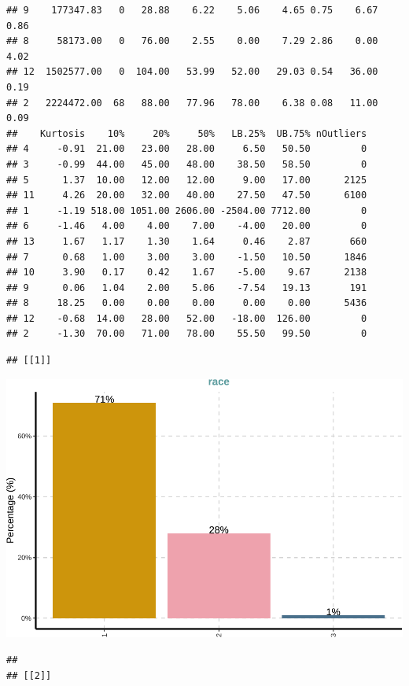\documentclass[
]{article}
\begin{document}
\begin{verbatim}
## 9    177347.83   0   28.88    6.22    5.06    4.65 0.75    6.67     0.86
## 8     58173.00   0   76.00    2.55    0.00    7.29 2.86    0.00     4.02
## 12  1502577.00   0  104.00   53.99   52.00   29.03 0.54   36.00     0.19
## 2   2224472.00  68   88.00   77.96   78.00    6.38 0.08   11.00     0.09
##    Kurtosis    10%     20%     50%   LB.25%  UB.75% nOutliers
## 4     -0.91  21.00   23.00   28.00     6.50   50.50         0
## 3     -0.99  44.00   45.00   48.00    38.50   58.50         0
## 5      1.37  10.00   12.00   12.00     9.00   17.00      2125
## 11     4.26  20.00   32.00   40.00    27.50   47.50      6100
## 1     -1.19 518.00 1051.00 2606.00 -2504.00 7712.00         0
## 6     -1.46   4.00    4.00    7.00    -4.00   20.00         0
## 13     1.67   1.17    1.30    1.64     0.46    2.87       660
## 7      0.68   1.00    3.00    3.00    -1.50   10.50      1846
## 10     3.90   0.17    0.42    1.67    -5.00    9.67      2138
## 9      0.06   1.04    2.00    5.06    -7.54   19.13       191
## 8     18.25   0.00    0.00    0.00     0.00    0.00      5436
## 12    -0.68  14.00   28.00   52.00   -18.00  126.00         0
## 2     -1.30  70.00   71.00   78.00    55.50   99.50         0
\end{verbatim}

\begin{verbatim}
## [[1]]
\end{verbatim}

\includegraphics{notebook_panel_data_files/figure-latex/Exploratory data analysis-1.pdf}

\begin{verbatim}
## 
## [[2]]
\end{verbatim}
\end{document}

